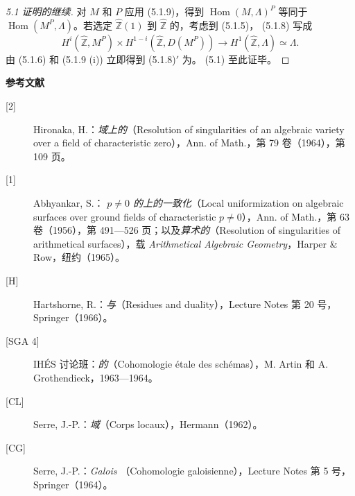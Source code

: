 \begin{proof}[ 5.1 证明的继续]
对 $M$ 和 $P$ 应用 (5.1.9)，得到 $\operatorname{Hom}(M,\Lambda)^P$ 等同于 $\operatorname{Hom}(M^P,\Lambda)$。若选定 $\widehat{\mathbb Z}(1)$ 到 $\widehat{\mathbb Z}$ 的，考虑到 (5.1.5)， (5.1.8) 写成
\[
H^i(\widehat{\mathbb Z},M^P)\times H^{1-i}(\widehat{\mathbb Z},D(M^P))\longrightarrow H^1(\widehat{\mathbb Z},\Lambda)\simeq\Lambda.\tag{5.1.8$'$}
\]
由 (5.1.6) 和 (5.1.9 (i)) 立即得到 (5.1.8)$'$ 为。 (5.1) 至此证毕。
\end{proof}

\textbf{参考文献}
\begin{description}
\item[{[2]}] Hironaka, H.：\emph{域上的}（Resolution of singularities of an algebraic variety over a field of characteristic zero），Ann. of Math.，第 79 卷（1964），第 109 页。
\item[{[1]}] Abhyankar, S.：\emph{ $p\ne0$ 的上的一致化}（Local uniformization on algebraic surfaces over ground fields of characteristic $p\ne0$），Ann. of Math.，第 63 卷（1956），第 491—526 页；以及\emph{算术的}（Resolution of singularities of arithmetical surfaces），载 \emph{Arithmetical Algebraic Geometry}，Harper \& Row，纽约（1965）。
\item[{[H]}] Hartshorne, R.：\emph{与}（Residues and duality），Lecture Notes 第 20 号，Springer（1966）。
\item[{[SGA 4]}] IHÉS 讨论班：\emph{的}（Cohomologie étale des schémas），M. Artin 和 A. Grothendieck，1963—1964。
\item[{[CL]}] Serre, J.-P.：\emph{域}（Corps locaux），Hermann（1962）。
\item[{[CG]}] Serre, J.-P.：\emph{Galois }（Cohomologie galoisienne），Lecture Notes 第 5 号，Springer（1964）。
\end{description}
